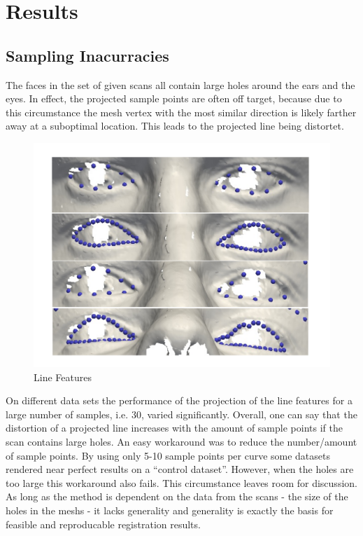 \chapter{Results}

\section{Sampling Inacurracies}
The faces in the set of given scans all contain large holes around the ears and the eyes. In effect, the projected sample points are often off target, because due to this circumstance the mesh vertex with the most similar direction is likely farther away at a suboptimal location. This leads to the projected line being distortet.
\begin{figure}[h!]
    \includegraphics[width=.7\textwidth]{./resources/img/linefeatures_eyes.pdf}
    \caption{Line Features}
    \label{fig:linefeature_comparison}
\end{figure}

On different data sets the performance of the projection of the line features for a large number of
samples, i.e. 30, varied significantly. Overall, one can say that the distortion of a projected line increases with the amount of sample points if the scan contains large holes.
An easy workaround was to reduce the number/amount of sample points. By using only 5-10 sample points per curve some datasets rendered near perfect results on a ``control dataset''. However, when the holes are too large this workaround also fails. This circumstance leaves room for discussion. As long as the method is dependent on the data from the scans - the size of the holes in the meshs - it lacks generality and generality is exactly the basis for feasible and reproducable registration results.\\


